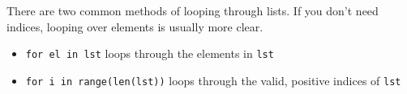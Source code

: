 There are two common methods of looping through lists.  If you don't need
indices, looping over elements is usually more clear.

\begin{itemize}
\item {\tt for el in lst} loops through the elements in {\tt lst}
\item {\tt for i in range(len(lst))} loops through the valid, positive indices
of {\tt lst}
\end{itemize}
